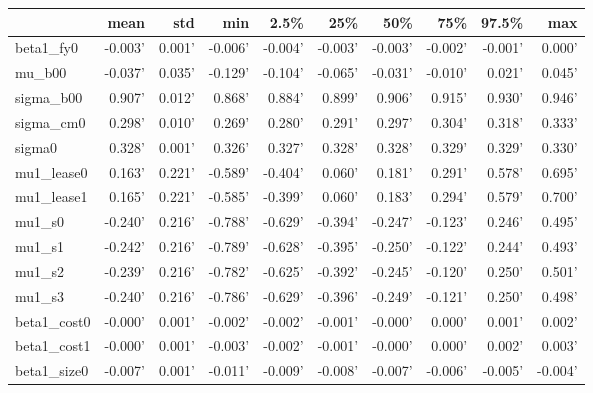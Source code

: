 \begin{tabular}{lrrrrrrrrr}
\toprule
{} &    mean &    std &     min &    2.5\% &     25\% &     50\% &     75\% &   97.5\% &     max \\
\midrule
beta1\_fy0   & -0.003' & 0.001' & -0.006' & -0.004' & -0.003' & -0.003' & -0.002' & -0.001' &  0.000' \\
mu\_b00      & -0.037' & 0.035' & -0.129' & -0.104' & -0.065' & -0.031' & -0.010' &  0.021' &  0.045' \\
sigma\_b00   &  0.907' & 0.012' &  0.868' &  0.884' &  0.899' &  0.906' &  0.915' &  0.930' &  0.946' \\
sigma\_cm0   &  0.298' & 0.010' &  0.269' &  0.280' &  0.291' &  0.297' &  0.304' &  0.318' &  0.333' \\
sigma0      &  0.328' & 0.001' &  0.326' &  0.327' &  0.328' &  0.328' &  0.329' &  0.329' &  0.330' \\
mu1\_lease0  &  0.163' & 0.221' & -0.589' & -0.404' &  0.060' &  0.181' &  0.291' &  0.578' &  0.695' \\
mu1\_lease1  &  0.165' & 0.221' & -0.585' & -0.399' &  0.060' &  0.183' &  0.294' &  0.579' &  0.700' \\
mu1\_s0      & -0.240' & 0.216' & -0.788' & -0.629' & -0.394' & -0.247' & -0.123' &  0.246' &  0.495' \\
mu1\_s1      & -0.242' & 0.216' & -0.789' & -0.628' & -0.395' & -0.250' & -0.122' &  0.244' &  0.493' \\
mu1\_s2      & -0.239' & 0.216' & -0.782' & -0.625' & -0.392' & -0.245' & -0.120' &  0.250' &  0.501' \\
mu1\_s3      & -0.240' & 0.216' & -0.786' & -0.629' & -0.396' & -0.249' & -0.121' &  0.250' &  0.498' \\
beta1\_cost0 & -0.000' & 0.001' & -0.002' & -0.002' & -0.001' & -0.000' &  0.000' &  0.001' &  0.002' \\
beta1\_cost1 & -0.000' & 0.001' & -0.003' & -0.002' & -0.001' & -0.000' &  0.000' &  0.002' &  0.003' \\
beta1\_size0 & -0.007' & 0.001' & -0.011' & -0.009' & -0.008' & -0.007' & -0.006' & -0.005' & -0.004' \\
\bottomrule
\end{tabular}
